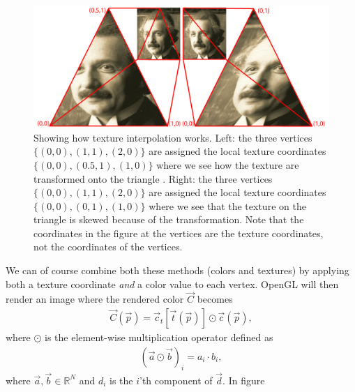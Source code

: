 \begin{figure}[h]
\begin{center}
\includegraphics[width=\textwidth, trim=0cm 0cm 0cm 0cm, clip]{opengl/figures/texture_interpolation.png}
\end{center}
\caption{Showing how texture interpolation works. Left: the three vertices $\{(0,0), (1,1), (2,0)\}$ are assigned the local texture coordinates $\{(0,0), (0.5,1), (1,0)\}$ where we see how the texture are transformed onto the triangle . Right: the three vertices $\{(0,0), (1,1), (2,0)\}$ are assigned the local texture coordinates $\{(0,0), (0,1), (1,0)\}$ where we see that the texture on the triangle is skewed because of the transformation. Note that the coordinates in the figure at the vertices are the texture coordinates, not the coordinates of the vertices.}
\label{fig:opengl_texture_interpolation}
\end{figure}
We can of course combine both these methods (colors and textures) by applying both a texture coordinate \textit{and} a color value to each vertex. OpenGL will then render an image where the rendered color $\vec C$ becomes
\begin{align}
	\label{eq:opengl_combining_colors_textures}
	\vec C(\vec p) = \vec c_t[\vec t(\vec p)] \odot \vec c(\vec p),
\end{align}
where $\odot$ is the element-wise multiplication operator defined as
\begin{align}
	(\vec a \odot \vec b)_i = a_i\cdot b_i,
\end{align}
where $\vec a,\vec b \in \mathbb{R}^N$ and $d_i$ is the $i$'th component of $\vec d$. In figure 
